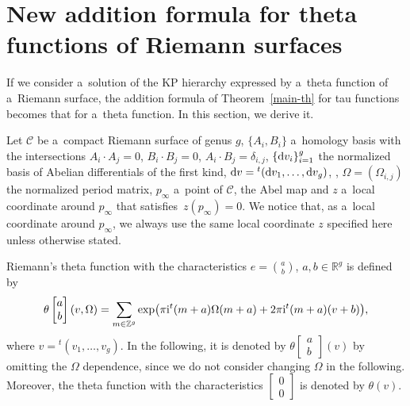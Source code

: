 \documentclass[10pt,a4paper]{amsart}
\numberwithin{equation}{section}
\theoremstyle{definition}
\begin{document}
\section{New addition formula for theta functions of Riemann surfaces}\label{sec6}
If we consider a~solution of the KP hierarchy expressed by a~theta function of a~Riemann surface,
the addition formula of Theorem~\ref{main-th} for tau functions becomes that for a~theta function.
 In this section, we derive it.


Let ${\mathcal C}$ be a~compact Riemann surface of genus $g$, $\{A_i,B_i\}$ a~homology basis
with the intersections $A_i\cdot A_j=0$, $B_i\cdot B_j=0$, $A_i\cdot B_j=\delta_{i,j}$,
$\{{\rm d}v_i\}_{i=1}^g$ the normalized basis of Abelian differentials of the first kind, ${\rm d}v={}^t({\rm d}v_1,\dots ,{\rm d}v_g)$, , $\Omega=(\Omega_{i,j})$ the normalized period matrix, $p_\infty$ a~point of ${\mathcal C}$,  the Abel map and $z$ a~local coordinate around $p_\infty$ that satisfies~${z(p_\infty)=0}$.
We notice that, as a~local coordinate around $p_\infty$, we always use the same local coordinate $z$ specified here unless otherwise stated.


Riemann's theta function with the characteristics $e=\binom{a}{b}$, $a,b\in {\mathbb R}^g$
is defined by
\begin{gather*}
\theta
\left[\begin{matrix}
a\\b
\end{matrix}\right]
(v,\Omega)=\sum_{m\in {\mathbb Z}^g}\exp\bigl(\pi{\rm i}{}^t(m+a) \Omega (m+a)+2\pi{\rm i} {}^t (m+a)(v+b)\bigr),
\end{gather*}
where $v={}^t(v_1,\dots ,v_g)$.
In the following, it is denoted by
$ \theta\left[\begin{smallmatrix}a\\b\end{smallmatrix}\right](v)$
by omitting the
$\Omega$ dependence, since we do not consider changing $\Omega$ in the
following.
Moreover, the theta function with the characteristics
$\left[\begin{smallmatrix}0\\0\end{smallmatrix}\right]$ is
denoted by $\theta(v)$.
\end{document}
